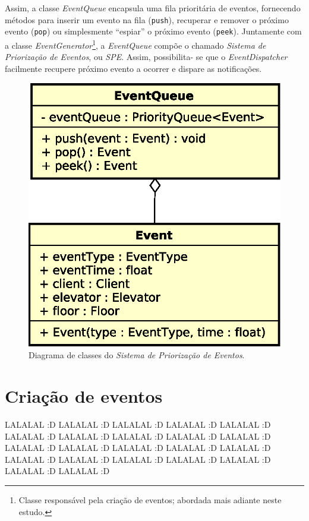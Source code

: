 Assim, a classe \textit{EventQueue} encapsula uma fila prioritária de eventos,
fornecendo métodos para inserir um evento na fila (\texttt{push}), recuperar e
remover o próximo evento (\texttt{pop}) ou simplesmente ``espiar'' o próximo
evento (\texttt{peek}). Juntamente com a classe
\textit{EventGenerator}\footnote{Classe responsável pela criação de eventos;
abordada mais adiante neste estudo.}, a \textit{EventQueue} compõe o chamado
\textit{Sistema de Priorização de Eventos}, ou \textit{SPE}. Assim, possibilita-
se que o \textit{EventDispatcher} facilmente recupere próximo evento a ocorrer e
dispare as notificações.

\begin{figure}[htb!]
  \centering
  \includegraphics[scale=0.6]{img/EventQueue.eps}
  \caption{Diagrama de classes do \textit{Sistema de Priorização de Eventos}.}
\label{fig:diagram:event:manage}
\end{figure}

\section{\label{sec:model:generator}Criação de eventos}

LALALAL :D LALALAL :D LALALAL :D LALALAL :D LALALAL :D LALALAL :D LALALAL :D
LALALAL :D LALALAL :D LALALAL :D LALALAL :D LALALAL :D LALALAL :D LALALAL :D
LALALAL :D LALALAL :D LALALAL :D LALALAL :D LALALAL :D LALALAL :D LALALAL :D
LALALAL :D

